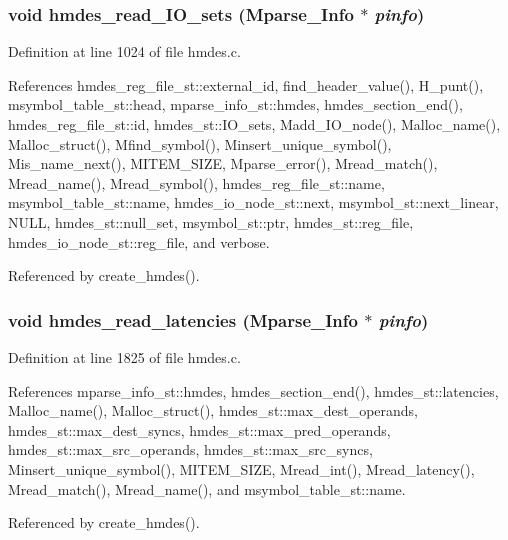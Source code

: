 \subsubsection{\setlength{\rightskip}{0pt plus 5cm}void hmdes\_\-read\_\-IO\_\-sets (\bf{Mparse\_\-Info} $\ast$ {\em pinfo})}\label{hmdes_8c_dd0bc36d354a0e2a80aa51d52fa69bf9}




Definition at line 1024 of file hmdes.c.

References hmdes\_\-reg\_\-file\_\-st::external\_\-id, find\_\-header\_\-value(), H\_\-punt(), msymbol\_\-table\_\-st::head, mparse\_\-info\_\-st::hmdes, hmdes\_\-section\_\-end(), hmdes\_\-reg\_\-file\_\-st::id, hmdes\_\-st::IO\_\-sets, Madd\_\-IO\_\-node(), Malloc\_\-name(), Malloc\_\-struct(), Mfind\_\-symbol(), Minsert\_\-unique\_\-symbol(), Mis\_\-name\_\-next(), MITEM\_\-SIZE, Mparse\_\-error(), Mread\_\-match(), Mread\_\-name(), Mread\_\-symbol(), hmdes\_\-reg\_\-file\_\-st::name, msymbol\_\-table\_\-st::name, hmdes\_\-io\_\-node\_\-st::next, msymbol\_\-st::next\_\-linear, NULL, hmdes\_\-st::null\_\-set, msymbol\_\-st::ptr, hmdes\_\-st::reg\_\-file, hmdes\_\-io\_\-node\_\-st::reg\_\-file, and verbose.

Referenced by create\_\-hmdes().
\subsubsection{\setlength{\rightskip}{0pt plus 5cm}void hmdes\_\-read\_\-latencies (\bf{Mparse\_\-Info} $\ast$ {\em pinfo})}\label{hmdes_8c_471fe0226c28abff0c284e7249168862}




Definition at line 1825 of file hmdes.c.

References mparse\_\-info\_\-st::hmdes, hmdes\_\-section\_\-end(), hmdes\_\-st::latencies, Malloc\_\-name(), Malloc\_\-struct(), hmdes\_\-st::max\_\-dest\_\-operands, hmdes\_\-st::max\_\-dest\_\-syncs, hmdes\_\-st::max\_\-pred\_\-operands, hmdes\_\-st::max\_\-src\_\-operands, hmdes\_\-st::max\_\-src\_\-syncs, Minsert\_\-unique\_\-symbol(), MITEM\_\-SIZE, Mread\_\-int(), Mread\_\-latency(), Mread\_\-match(), Mread\_\-name(), and msymbol\_\-table\_\-st::name.

Referenced by create\_\-hmdes().
